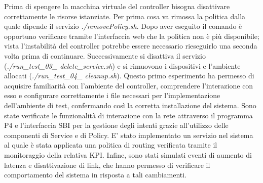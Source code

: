 \newline Prima di spengere la macchina virtuale del controller bisogna disattivare correttamente le risorse istanziate.
Per prima cosa va rimossa la politica dalla quale dipende il servizio \textit{./removePolicy.sh}. Dopo aver eseguito il comando 
è opportuno verificare tramite l'interfaccia web che la politica non è più disponibile; vista l'instabilità del controller potrebbe essere necessario rieseguirlo una seconda volta prima di continuare.
Successivamente si disattiva il servizio (\textit{./run\_test\_03\_ delete\_service.sh}) e si rimuovono i dispositivi e l'ambiente allocati (\textit{./run\_test\_04\_ cleanup.sh}).
\newline Questo primo esperimento ha permesso di acquisire familiarità con l'ambiente del controller, 
comprendere l'interazione con esso e configurare correttamente i file necessari per l'implementazione dell'ambiente di test, confermando così la corretta installazione del sistema.
Sono state verificate le funzionalità di interazione con la rete attraverso il programma P4 e l'interfaccia SBI per la
gestione degli intenti grazie all'utilizzo delle componenti di Service e di Policy.
E' stato implementato un servizio nel sistema al quale è stata applicata una politica di routing 
verificata tramite il monitoraggio della relativa KPI.
Infine, sono stati simulati eventi di aumento di latenza e disattivazione di link, che hanno permesso di 
verificare il comportamento del sistema in risposta a tali cambiamenti.
